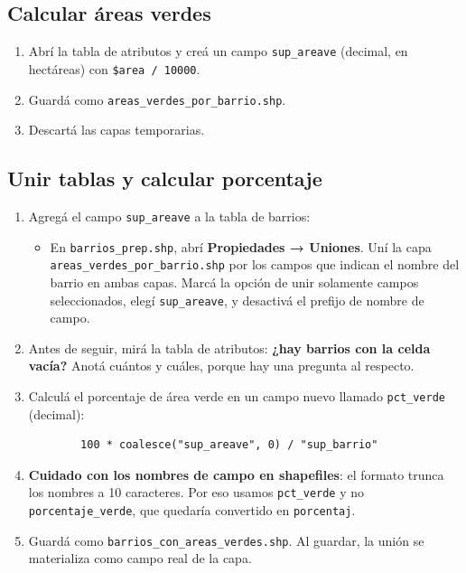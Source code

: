 \documentclass{article}
\begin{document}
\subsection{Calcular áreas verdes}
\begin{enumerate}
    \item Abrí la tabla de atributos y creá un campo \texttt{sup\_areave} (decimal, en hectáreas) con \texttt{\$area / 10000}.
    \item Guardá como \texttt{areas\_verdes\_por\_barrio.shp}.
    \item Descartá las capas temporarias.
\end{enumerate}

\subsection{Unir tablas y calcular porcentaje}
\begin{enumerate}
    \item Agregá el campo \texttt{sup\_areave} a la tabla de barrios:
    \begin{itemize}
        \item En \texttt{barrios\_prep.shp}, abrí \textbf{Propiedades → Uniones}. Uní la capa \texttt{areas\_verdes\_por\_barrio.shp} por los campos que indican el nombre del barrio en ambas capas. Marcá la opción de unir solamente campos seleccionados, elegí \texttt{sup\_areave}, y desactivá el prefijo de nombre de campo.
    \end{itemize}
    \item Antes de seguir, mirá la tabla de atributos: \textbf{¿hay barrios con la celda vacía?} Anotá cuántos y cuáles, porque hay una pregunta al respecto.
    \item Calculá el porcentaje de área verde en un campo nuevo llamado \texttt{pct\_verde} (decimal):
    \begin{verbatim}
        100 * coalesce("sup_areave", 0) / "sup_barrio"
    \end{verbatim}
    \item \textbf{Cuidado con los nombres de campo en shapefiles}: el formato trunca los nombres a 10 caracteres. Por eso usamos \texttt{pct\_verde} y no \texttt{porcentaje\_verde}, que quedaría convertido en \texttt{porcentaj}.
    \item Guardá como \texttt{barrios\_con\_areas\_verdes.shp}. Al guardar, la unión se materializa como campo real de la capa.
\end{enumerate}
\end{document}
